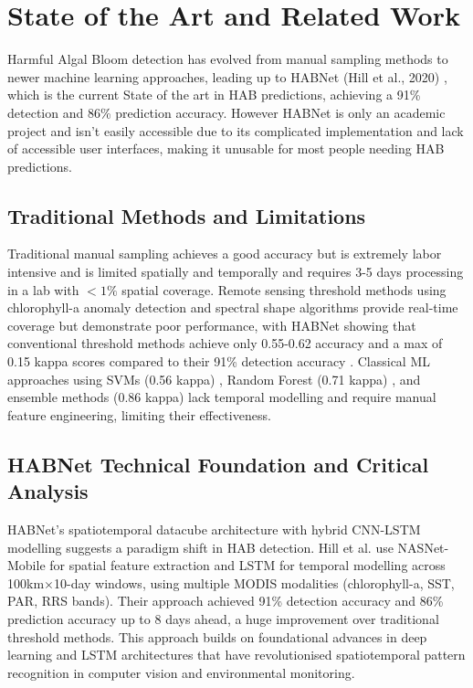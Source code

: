 \documentclass[conference]{IEEEtran}
\begin{document}
\section{State of the Art and Related Work}

Harmful Algal Bloom detection has evolved from manual sampling methods to newer machine learning approaches, leading up to HABNet (Hill et al., 2020) \cite{b1}, which is the current State of the art in HAB predictions, achieving a 91\% detection and 86\% prediction accuracy. However HABNet is only an academic project and isn't easily accessible due to its complicated implementation and lack of accessible user interfaces, making it unusable for most people needing HAB predictions.

\subsection{Traditional Methods and Limitations}

Traditional manual sampling achieves a good accuracy but is extremely labor intensive and is limited spatially and temporally \cite{b2} and requires 3-5 days processing in a lab with $<1\%$ spatial coverage. Remote sensing threshold methods using chlorophyll-a anomaly detection  \cite{b3} and spectral shape algorithms \cite{b4} provide real-time coverage but demonstrate poor performance, with HABNet showing that conventional threshold methods achieve only 0.55-0.62 accuracy and a max of 0.15 kappa scores compared to their 91\% detection accuracy \cite{b1}. Classical ML approaches using SVMs (0.56 kappa) \cite{b5}, Random Forest (0.71 kappa) \cite{b5}, and ensemble methods (0.86 kappa) \cite{b6} lack temporal modelling and require manual feature engineering, limiting their effectiveness.

\subsection{HABNet Technical Foundation and Critical Analysis}

HABNet's spatiotemporal datacube architecture with hybrid CNN-LSTM modelling suggests a paradigm shift in HAB detection. Hill et al. \cite{b1} use NASNet-Mobile for spatial feature extraction and LSTM for temporal modelling across 100km$\times$10-day windows, using multiple MODIS modalities (chlorophyll-a, SST, PAR, RRS bands). Their approach achieved 91\% detection accuracy and 86\% prediction accuracy up to 8 days ahead, a huge improvement over traditional threshold methods. This approach builds on foundational advances in deep learning \cite{b7} and LSTM architectures \cite{b8} that have revolutionised spatiotemporal pattern recognition in computer vision and environmental monitoring.
\end{document}
